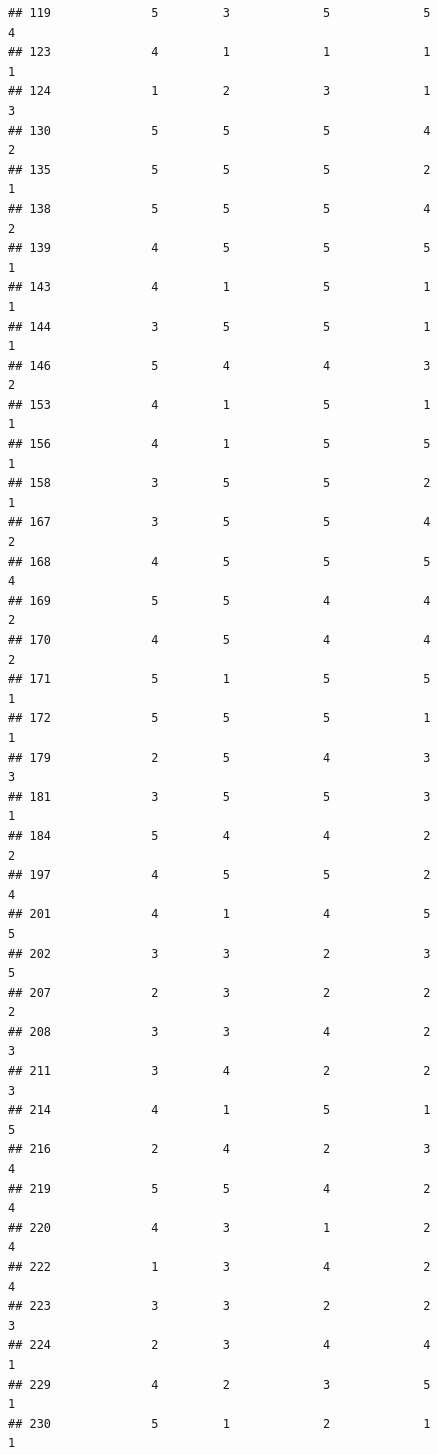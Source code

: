 \documentclass[
]{article}
\begin{document}
\begin{verbatim}
## 119              5         3             5             5           4
## 123              4         1             1             1           1
## 124              1         2             3             1           3
## 130              5         5             5             4           2
## 135              5         5             5             2           1
## 138              5         5             5             4           2
## 139              4         5             5             5           1
## 143              4         1             5             1           1
## 144              3         5             5             1           1
## 146              5         4             4             3           2
## 153              4         1             5             1           1
## 156              4         1             5             5           1
## 158              3         5             5             2           1
## 167              3         5             5             4           2
## 168              4         5             5             5           4
## 169              5         5             4             4           2
## 170              4         5             4             4           2
## 171              5         1             5             5           1
## 172              5         5             5             1           1
## 179              2         5             4             3           3
## 181              3         5             5             3           1
## 184              5         4             4             2           2
## 197              4         5             5             2           4
## 201              4         1             4             5           5
## 202              3         3             2             3           5
## 207              2         3             2             2           2
## 208              3         3             4             2           3
## 211              3         4             2             2           3
## 214              4         1             5             1           5
## 216              2         4             2             3           4
## 219              5         5             4             2           4
## 220              4         3             1             2           4
## 222              1         3             4             2           4
## 223              3         3             2             2           3
## 224              2         3             4             4           1
## 229              4         2             3             5           1
## 230              5         1             2             1           1

\end{verbatim}
\end{document}
